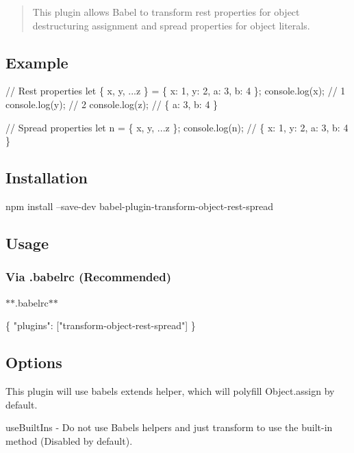 \begin{quote}
This plugin allows Babel to transform rest properties for object destructuring assignment and spread properties for object literals. \end{quote}


\subsection*{Example}


\begin{DoxyCode}
// Rest properties
let \{ x, y, ...z \} = \{ x: 1, y: 2, a: 3, b: 4 \};
console.log(x); // 1
console.log(y); // 2
console.log(z); // \{ a: 3, b: 4 \}

// Spread properties
let n = \{ x, y, ...z \};
console.log(n); // \{ x: 1, y: 2, a: 3, b: 4 \}
\end{DoxyCode}


\subsection*{Installation}


\begin{DoxyCode}
npm install --save-dev babel-plugin-transform-object-rest-spread
\end{DoxyCode}


\subsection*{Usage}

\subsubsection*{Via {\ttfamily .babelrc} (Recommended)}

$\ast$$\ast$.babelrc$\ast$$\ast$


\begin{DoxyCode}
\{
  "plugins": ["transform-object-rest-spread"]
\}
\end{DoxyCode}


\subsection*{Options}

This plugin will use babel\textquotesingle{}s {\ttfamily extends} helper, which will polyfill {\ttfamily Object.\+assign} by default.


\begin{DoxyItemize}
\item {\ttfamily use\+Built\+Ins} -\/ Do not use Babel\textquotesingle{}s helper\textquotesingle{}s and just transform to use the built-\/in method (Disabled by default).
\end{DoxyItemize}


